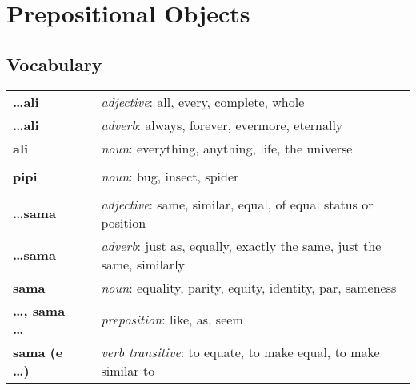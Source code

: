 \section{Prepositional Objects}
%
\subsection*{Vocabulary}
%
\begin{supertabular}{p{2,5cm}|ll}
    \textbf{\dots ali}           &  & \textit{adjective}: all, every, complete, whole                               \\ %
    \textbf{\dots ali}           &  & \textit{adverb}: always, forever, evermore, eternally                         \\ %
    \textbf{ali}                 &  & \textit{noun}: everything, anything, life, the universe                       \\ %
                                 &  &                                                                               \\ %
    \textbf{pipi}                &  & \textit{noun}: bug, insect, spider                                            \\ %
                                 &  &                                                                               \\ %
    \textbf{\dots sama}          &  & \textit{adjective}: same, similar, equal, of equal status or position         \\ %
    \textbf{\dots sama}          &  & \textit{adverb}: just as, equally, exactly the same, just the same, similarly \\ %
    \textbf{sama}                &  & \textit{noun}: equality, parity, equity, identity, par, sameness              \\ %
    \textbf{\dots , sama \dots}  &  & \textit{preposition}: like, as, seem                                          \\ %
    \textbf{sama (e \dots)}      &  & \textit{verb transitive}: to equate, to make equal, to make similar to        \\ %

\end{supertabular}
